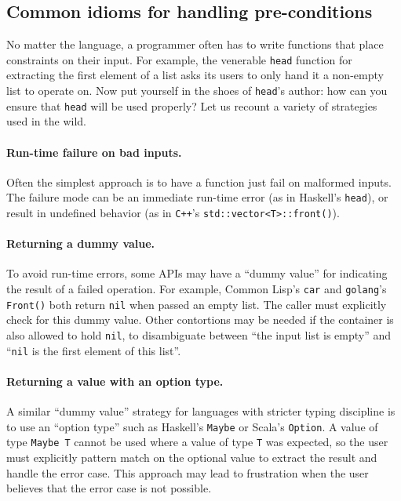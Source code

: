 \documentclass[format=sigplan, review=false, screen=true]{acmart}
\begin{document}
\subsection{Common idioms for handling pre-conditions}

No matter the language, a programmer often has to write functions
that place constraints on their input. For example, the venerable
\texttt{head} function for extracting the first element of a list
asks its users to only hand it a non-empty list to operate on.
Now put yourself in the shoes of \texttt{head}'s author: how can
you ensure that \texttt{head} will be used properly? Let us recount
a variety of strategies used in the wild.

\paragraph{Run-time failure on bad inputs.}
Often the simplest approach is
  to have a function just fail on malformed inputs. The failure mode can
  be an immediate run-time error (as in Haskell's \texttt{head}), or result in
  undefined behavior (as in \texttt{C++}'s \texttt{std::vector<T>::front()}).
  
\paragraph{Returning a dummy value.}
  To avoid run-time errors, some APIs may have a ``dummy value''
  for indicating the result of a failed operation. For example, Common Lisp's
  \texttt{car} and \texttt{golang}'s \texttt{Front()} both return \texttt{nil}
  when passed an empty list. The caller must explicitly check for this dummy
  value. Other contortions may be needed if the container is also allowed to
  hold \texttt{nil}, to disambiguate between ``the input list is empty'' and
  ``\texttt{nil} is the first element of this list''.

\paragraph{Returning a value with an option type.}
  A similar ``dummy value'' strategy
  for languages with stricter typing discipline is to use an ``option type'' such
  as Haskell's \texttt{Maybe} or Scala's \texttt{Option}. A value of type \texttt{Maybe T}
  cannot be used where a value of type \texttt{T} was expected, so the user must
  explicitly pattern match on the optional value to extract the result and handle the
  error case. This approach may lead to frustration when the user believes that the
  error case is not possible.
  
\end{document}
